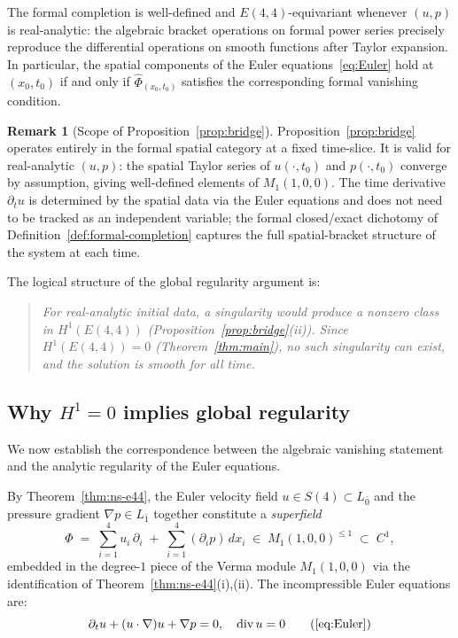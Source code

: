 \documentclass[reqno,10pt]{amsart}
\theoremstyle{definition}
\newtheorem{rem}[subsubsection]{Remark}
\def\Sn{S(4)}
\def\divX{{\operatorname{div}}}
\begin{document}
The formal completion is well-defined and $E(4,4)$-equivariant whenever
$(u,p)$ is real-analytic: the algebraic bracket operations on formal power
series precisely reproduce the differential operations on smooth functions
after Taylor expansion.  In particular, the spatial components of the Euler
equations~\eqref{eq:Euler} hold at $(x_0,t_0)$ if and only if
$\widehat{\Phi}_{(x_0,t_0)}$ satisfies the corresponding formal
vanishing condition.

\begin{rem}[Scope of Proposition~\ref{prop:bridge}]\label{rem:smooth-only}
Proposition~\ref{prop:bridge} operates entirely in the formal spatial category
at a fixed time-slice.  It is valid for real-analytic $(u,p)$: the spatial
Taylor series of $u(\cdot,t_0)$ and $p(\cdot,t_0)$ converge by assumption,
giving well-defined elements of $M_1(1,0,0)$.  The time derivative
$\partial_t u$ is determined by the spatial data via the Euler equations
and does not need to be tracked as an independent variable; the formal
closed/exact dichotomy of Definition~\ref{def:formal-completion} captures
the full spatial-bracket structure of the system at each time.
\end{rem}

The logical structure of the global regularity argument is:

\begin{quote}
\emph{For real-analytic initial data, a singularity would produce a
nonzero class in $H^1(E(4,4))$ (Proposition~\ref{prop:bridge}(ii)).
Since $H^1(E(4,4))=0$ (Theorem~\ref{thm:main}), no such singularity
can exist, and the solution is smooth for all time.}
\end{quote}

\subsection{Why $H^1=0$ implies global regularity}

We now establish the correspondence between the algebraic vanishing statement and
the analytic regularity of the Euler equations.

By Theorem~\ref{thm:ns-e44}, the Euler velocity field
$u\in\Sn\subset L_{\bar 0}$ and the pressure gradient $\nabla p\in L_{\bar 1}$
together constitute a \emph{superfield}
\[
  \Phi \;=\; \sum_{i=1}^4 u_i\,\partial_i \;+\; \sum_{i=1}^4 (\partial_i p)\,dx_i
  \;\in\; M_1(1,0,0)^{\leq 1}\;\subset\; C^1,
\]
embedded in the degree-$1$ piece of the Verma module $M_1(1,0,0)$ via the
identification of Theorem~\ref{thm:ns-e44}(i),(ii).
The incompressible Euler equations are:
\begin{equation*}
  \partial_t u + (u\cdot\nabla)u + \nabla p = 0,\quad \divX\, u = 0
  \tag{\ref{eq:Euler}}
\end{equation*}
\end{document}

